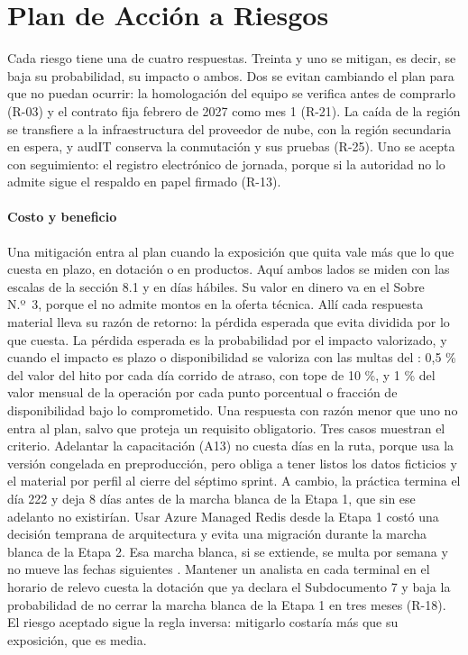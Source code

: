 \section{Plan de Acción a Riesgos}\label{sec:8-accion}

Cada riesgo tiene una de cuatro respuestas. Treinta y uno se mitigan, es decir, se baja su probabilidad,
su impacto o ambos. Dos se evitan cambiando el plan para que no puedan ocurrir: la homologación del
equipo se verifica antes de comprarlo (R-03) y el contrato fija febrero de 2027 como mes 1 (R-21). La
caída de la región se transfiere a la infraestructura del proveedor de nube, con la región secundaria en
espera, y audIT conserva la conmutación y sus pruebas (R-25). Uno se acepta con seguimiento: el registro
electrónico de jornada, porque si la autoridad no lo admite sigue el respaldo en papel firmado (R-13).

\paragraph{Costo y beneficio}
Una mitigación entra al plan cuando la exposición que quita vale más que lo que cuesta en plazo, en
dotación o en productos. Aquí ambos lados se miden con las escalas de la sección 8.1 y en días hábiles.
Su valor en dinero va en el Sobre N.º~3, porque el  no admite montos en la oferta técnica.
Allí cada respuesta material lleva su razón de retorno: la pérdida esperada que evita dividida por lo que
cuesta. La pérdida esperada es la probabilidad por el impacto valorizado, y cuando el impacto es plazo o
disponibilidad se valoriza con las multas del : 0,5 \% del valor del hito por cada día
corrido de atraso, con tope de 10 \%, y 1 \% del valor mensual de la operación por cada punto porcentual
o fracción de disponibilidad bajo lo comprometido. Una respuesta con razón menor que uno no entra al plan, salvo que proteja un
requisito obligatorio. Tres casos muestran el criterio. Adelantar la capacitación (A13) no cuesta días en la ruta, porque usa
la versión congelada en preproducción, pero obliga a tener listos los datos ficticios y el material por
perfil al cierre del séptimo sprint. A cambio, la práctica termina el día 222 y deja 8 días antes de la
marcha blanca de la Etapa 1, que sin ese adelanto no existirían. Usar Azure Managed Redis desde la Etapa 1 costó una decisión temprana de
arquitectura y evita una migración durante la marcha blanca de la Etapa 2. Esa marcha blanca, si se
extiende, se multa por semana  y no mueve las fechas siguientes . Mantener un
analista en cada terminal en el horario de relevo cuesta la dotación que ya declara el Subdocumento 7 y
baja la probabilidad de no cerrar la marcha blanca de la Etapa 1 en tres meses (R-18). El riesgo
aceptado sigue la regla inversa: mitigarlo costaría más que su exposición, que es media.


